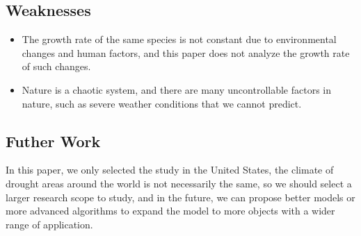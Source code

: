 \documentclass[12pt]{article}
\begin{document}
\subsection{Weaknesses}

\begin{itemize}
	\item The growth rate of the same species is not constant due to environmental changes and human factors, and this paper does not analyze the growth rate of such changes.
	\item Nature is a chaotic system, and there are many uncontrollable factors in nature, such as severe weather conditions that we cannot predict.
\end{itemize}

\subsection{Futher Work}

In this paper, we only selected the study in the United States, the climate of drought areas around the world is not necessarily the same, so we should select a larger research scope to study, and in the future, we can propose better models or more advanced algorithms to expand the model to more objects with a wider range of application.



\end{document}
